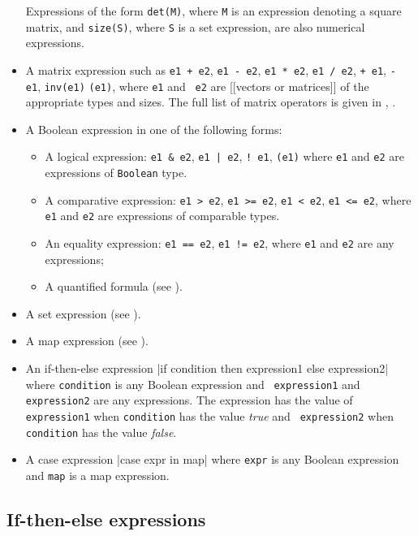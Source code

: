 \documentclass[12pt]{article}
\begin{document}
\begin{itemize}
  Expressions of the form {\tt det(M)}, where {\tt M} is an expression
  denoting a square matrix, and {\tt size(S)}, where {\tt S} is a set
  expression, are also numerical expressions.
\item A matrix expression such as \texttt{e1 + e2}, \texttt{e1 - e2},
  \texttt{e1 * e2}, \texttt{e1 / e2},  \texttt{+ e1},
  \texttt{- e1}, {\tt inv(e1)} \texttt{(e1)}, where {\tt e1} and {\tt
    e2} are [[vectors or matrices]] of the appropriate types and
  sizes. The full list of matrix
  operators is given in ,
  .
\item A Boolean expression in one of the following forms:
\begin{itemize}
\item A logical expression: \texttt{e1 \& e2}, \texttt{e1 | e2}, \texttt{! e1}, \texttt{(e1)} where 
\texttt{e1} and \texttt{e2} are expressions of {\tt Boolean} type.
\item A comparative expression: \texttt{e1 > e2}, \texttt{e1 >= e2}, \texttt{e1 < e2}, \texttt{e1 <= e2}, where \texttt{e1} and \texttt{e2} are expressions of comparable types.
\item An equality expression: \texttt{e1 == e2}, \texttt{e1 != e2}, where \texttt{e1} and \texttt{e2} are any expressions;
\item A quantified formula (see ).
\end{itemize}
\item A set expression (see ).
\item A map expression (see ).
\item An if-then-else expression
     \blog|if condition then expression1 else expression2|
     where {\tt condition} is any Boolean expression and {\tt
       expression1} and {\tt expression2} are any expressions.
     The expression has the value of {\tt
       expression1} when {\tt condition} has the value {\it true}
     and {\tt
       expression2} when {\tt condition} has the value {\it false}.
\item A case expression
    \blog|case expr in map|
     where {\tt expr} is any Boolean expression and {\tt map} is a map
     expression.
\end{itemize}


\subsection{If-then-else expressions}\label{if-then-else-section}
\end{document}
